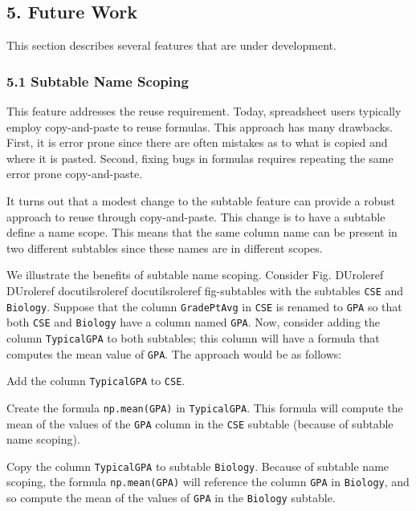 \documentclass[letterpaper,compsoc,twoside]{IEEEtran}
\providecommand*{\DUrole}[2]{%
  \ifcsname DUrole#1\endcsname%
    \csname DUrole#1\endcsname{#2}%
  \else%
    \ifcsname docutilsrole#1\endcsname%
      \csname docutilsrole#1\endcsname{#2}%
    \else%
      #2%
    \fi%
  \fi%
}
\begin{document}
\subsection{5. Future Work%
  \label{future-work}%
}


This section describes several features that are
under development.

\subsubsection{5.1 Subtable Name Scoping%
  \label{subtable-name-scoping}%
}


This feature addresses the reuse requirement.
Today, spreadsheet users typically employ copy-and-paste to reuse formulas.
This approach has many drawbacks.
First, it is error prone since there are often mistakes as to what is copied
and where it is pasted.
Second, fixing bugs in formulas requires repeating the
same error prone copy-and-paste.

It turns out that a modest change to the subtable feature can provide
a robust approach to
reuse through copy-and-paste.
This change is to have a subtable define a name scope.
This means that
the same column name can be present in two different subtables
since these names are in different scopes.

We illustrate
the benefits of subtable name scoping.
Consider Fig. \DUrole{ref}{fig-subtables} with the subtables
\texttt{CSE} and \texttt{Biology}.
Suppose that the column \texttt{GradePtAvg}
in \texttt{CSE} is renamed to \texttt{GPA} so that
both \texttt{CSE} and \texttt{Biology}
have a column named \texttt{GPA}.
Now, consider adding the
column \texttt{TypicalGPA} to both subtables;
this column will have a formula that computes the
mean value of \texttt{GPA}.
The approach would be as follows:\setcounter{listcnt0}{0}
\begin{list}{.}
{
\setlength{\rightmargin}{\leftmargin}
}

\item 

Add the column \texttt{TypicalGPA} to \texttt{CSE}.
\item 

Create the formula
\texttt{np.mean(GPA)} in
\texttt{TypicalGPA}.
This formula will compute the mean of the values
of the \texttt{GPA} column in the \texttt{CSE} subtable (because
of subtable name scoping).
\item 

Copy the column \texttt{TypicalGPA} to subtable \texttt{Biology}.
Because of subtable name scoping, the formula
\texttt{np.mean(GPA)} will reference the column \texttt{GPA} in
\texttt{Biology}, and so compute the mean of the values
of \texttt{GPA} in the \texttt{Biology} subtable.\end{list}
\end{document}
